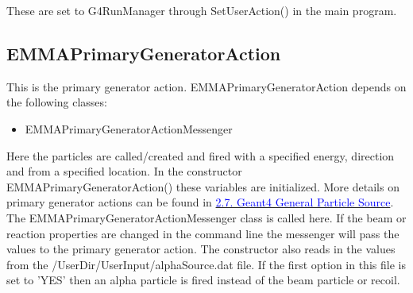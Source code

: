 \documentclass[letter,12pt]{article}
\newcommand{\filefont}[1]{{\fontfamily{pnc}\selectfont #1}\xspace}
\newcommand{\hrefcolor}[2]{\href{#1}{\textcolor{blue}{#2}}\xspace}
\begin{document}
These are set to \filefont{G4RunManager} through \filefont{SetUserAction()} in the main program.

\subsection{EMMAPrimaryGeneratorAction}

This is the primary generator action. \filefont{EMMAPrimaryGeneratorAction} depends on the following classes:
\begin{itemize}
\item \filefont{EMMAPrimaryGeneratorActionMessenger}
\end{itemize}

Here the particles are called/created and fired with a specified energy, direction and from a specified location. In the constructor \filefont{EMMAPrimaryGeneratorAction()} these variables are initialized. More details on primary generator actions can be found in \hrefcolor{http://geant4.web.cern.ch/geant4/UserDocumentation/UsersGuides/ForApplicationDeveloper/html/ch02s07.html}{2.7. Geant4 General Particle Source}. The \filefont{EMMAPrimaryGeneratorActionMessenger} class is called here. If the beam or reaction properties are changed in the command line the messenger will pass the values to the primary generator action. The constructor also reads in the values from the \filefont{/UserDir/UserInput/alphaSource.dat} file. If the first option in this file is set to 'YES' then an alpha particle is fired instead of the beam particle or recoil.
\end{document}

